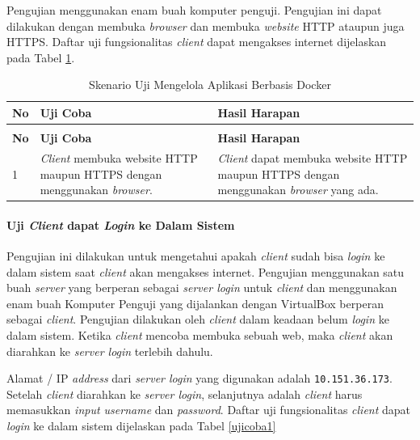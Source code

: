 Pengujian menggunakan enam buah komputer penguji. Pengujian ini dapat dilakukan dengan membuka \textit{browser} dan membuka \textit{website} HTTP ataupun juga HTTPS. Daftar uji fungsionalitas \textit{client} dapat mengakses internet dijelaskan pada Tabel \ref{ujicoba4}.
\begin{longtable}{|p{}|p{}|p{}|}					\caption{Skenario Uji \textit{Client} dapat Mengakses Internet} \label{ujicoba4} \\
	\hline
	\textbf{No} & \textbf{Uji Coba} & \textbf{Hasil Harapan} \\ \hline
	\endfirsthead
	\caption[]{Skenario Uji Mengelola Aplikasi Berbasis Docker} \\
	\hline
	\textbf{No} & \textbf{Uji Coba} & \textbf{Hasil Harapan} \\ \hline
	\endhead
	\endfoot
	\endlastfoot
	
	1 & \textit{Client} membuka website HTTP maupun HTTPS dengan menggunakan \textit{browser}. & \textit{Client} dapat membuka website HTTP maupun HTTPS dengan menggunakan \textit{browser} yang ada.\\ \hline
\end{longtable}

\paragraph{Uji \textit{Client} dapat \textit{Login} ke Dalam Sistem} \label{pertama}
Pengujian ini dilakukan untuk mengetahui apakah \textit{client} sudah bisa \textit{login} ke dalam sistem saat \textit{client} akan mengakses internet. Pengujian menggunakan satu buah \textit{server} yang berperan sebagai \textit{server login} untuk \textit{client} dan menggunakan enam buah Komputer Penguji yang dijalankan dengan VirtualBox berperan sebagai \textit{client}. Pengujian dilakukan oleh \textit{client} dalam keadaan belum \textit{login} ke dalam sistem. Ketika \textit{client} mencoba membuka sebuah web, maka \textit{client} akan diarahkan ke \textit{server login} terlebih dahulu.

Alamat / IP \textit{address} dari \textit{server login} yang digunakan adalah \texttt{10.151.36.173}. Setelah \textit{client} diarahkan ke \textit{server login}, selanjutnya adalah \textit{client} harus memasukkan \textit{input username} dan \textit{password}. Daftar uji fungsionalitas \textit{client} dapat \textit{login} ke dalam sistem dijelaskan pada Tabel \ref{ujicoba1}

